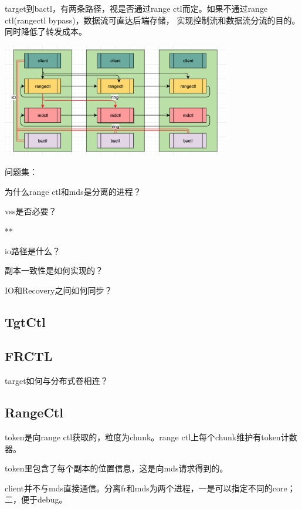 target到bactl，有两条路径，视是否通过range ctl而定。如果不通过range ctl(rangectl bypass)，数据流可直达后端存储，
实现控制流和数据流分流的目的。同时降低了转发成本。

\begin{center}
\includegraphics[width=10cm]{../imgs/arch/message-flow.png}
\end{center}

问题集：
\begin{enumbox}
\item 为什么range ctl和mds是分离的进程？
\item vss是否必要？
\item ***
\item io路径是什么？
\item 副本一致性是如何实现的？
\item IO和Recovery之间如何同步？
\end{enumbox}

\subsection{TgtCtl}

\subsection{FRCTL}

target如何与分布式卷相连？

\subsection{RangeCtl}

token是向range ctl获取的，粒度为chunk。range ctl上每个chunk维护有token计数器。

token里包含了每个副本的位置信息，这是向mds请求得到的。

client并不与mds直接通信。分离fr和mds为两个进程，一是可以指定不同的core；二，便于debug。


